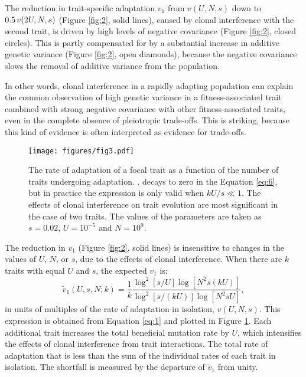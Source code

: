 \documentclass[9pt,twocolumn,twoside]{gsajnl}
\begin{document}
The reduction in trait-specific adaptation $v_1$ from $v(U,N,s)$ down to $0.5 \hspace{.02 in} v(2U,N,s)$ (Figure \ref{fig:2}, solid lines), caused by clonal interference with the second trait, is driven by high levels of negative covariance (Figure \ref{fig:2}, closed circles). This is partly compensated for by a substantial increase in additive genetic variance (Figure \ref{fig:2}, open diamonds), because the negative covariance slows the removal of additive variance from the population.

In other words, clonal interference in a rapidly adapting population can explain the common observation of high genetic variance in a fitness-associated trait combined with strong negative covariance with other fitness-associated traits, even in the complete absence of pleiotropic trade-offs. This is striking, because this kind of evidence is often interpreted as evidence for trade-offs. \par

\begin{figure}[!ht]
\centering
\texttt{[image: figures/fig3.pdf]}
\caption{The rate of adaptation of a focal trait as a function of the number of traits undergoing adaptation. . decays to zero in the Equation \ref{eq:6}, but in practice the expression is only valid when $kU/s \ll 1$. The effects of clonal interference on trait evolution are most significant in the case of two traits. The values of the parameters are taken as $s=0.02$, $U=10^{-5}$ and $N=10^9$.}
% 
% 
\label{fig:3}
\end{figure}

The reduction in $v_1$ (Figure \ref{fig:2}, solid lines) is insensitive to changes in the values of  $U$, $N$, or $s$, due to the effects of clonal interference. When there are $k$ traits with equal $U$ and $s$, the expected $v_1$ is: 
\begin{equation}\label{eq:6}
 \tilde{v}_1 (U,s,N;k) 
= \frac{1}{k}\frac{\log^2[s/U]\log[N^2s(kU)]}{\log^2[s/(kU)]\log[N^2sU]},
\end{equation}
in units of multiples of the rate of adaptation in isolation, $v(U,N,s)$. This expression is obtained from Equation \ref{eq:1} and plotted in Figure \ref{fig:3}. Each additional trait increases the total beneficial mutation rate by $U$, which intensifies the effects of clonal interference from trait interactions. The total rate of adaptation that is less than the sum of the individual rates of each trait in isolation. The shortfall is measured by the departure of $\tilde{v}_1$ from unity. \par
\end{document}
